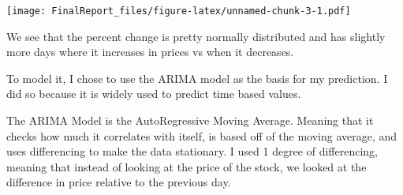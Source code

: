 \documentclass[]{article}
\newenvironment{Shaded}{\begin{snugshade}}{\end{snugshade}}
\newcommand{\DataTypeTok}[1]{\textcolor[rgb]{0.13,0.29,0.53}{#1}}
\newcommand{\DecValTok}[1]{\textcolor[rgb]{0.00,0.00,0.81}{#1}}
\newcommand{\KeywordTok}[1]{\textcolor[rgb]{0.13,0.29,0.53}{\textbf{#1}}}
\newcommand{\NormalTok}[1]{#1}
\newcommand{\OperatorTok}[1]{\textcolor[rgb]{0.81,0.36,0.00}{\textbf{#1}}}
\newcommand{\StringTok}[1]{\textcolor[rgb]{0.31,0.60,0.02}{#1}}
\begin{document}
\begin{Shaded}
\end{Shaded}

\texttt{[image: FinalReport\_files/figure-latex/unnamed-chunk-3-1.pdf]}

We see that the percent change is pretty normally distributed and has
slightly more days where it increases in prices vs when it decreases.

To model it, I chose to use the ARIMA model as the basis for my
prediction. I did so because it is widely used to predict time based
values.

The ARIMA Model is the AutoRegressive Moving Average. Meaning that it
checks how much it correlates with itself, is based off of the moving
average, and uses differencing to make the data stationary. I used 1
degree of differencing, meaning that instead of looking at the price of
the stock, we looked at the difference in price relative to the previous
day.
\end{document}
